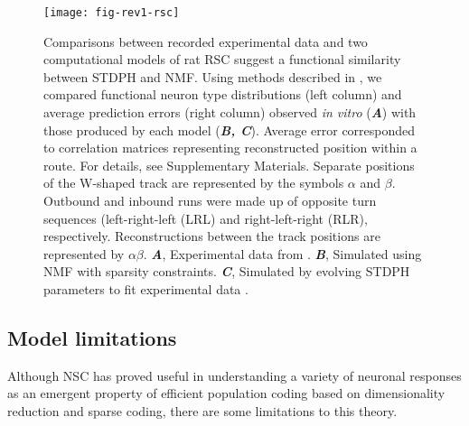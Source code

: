 \begin{figure}[h]
	\centering
	\texttt{[image: fig-rev1-rsc]}
    \caption{
    	Comparisons between recorded experimental data and two 
        computational models of rat \ac{RSC} suggest a functional 
        similarity between \ac{STDPH} and \ac{NMF}.
        Using methods described in \cite{AlexanderNitz2015}, 
        we compared functional neuron type distributions (left column)
        and average  prediction errors (right column)
        observed \emph{in vitro} (\textbf{\emph{A}}) with those
        produced by each model (\textbf{\emph{B, C}}).
        Average error corresponded to correlation matrices 
        representing reconstructed position within a route. 
        For details, see Supplementary Materials.
        Separate positions of the W-shaped track are represented 
        by the symbols $\alpha$ and $\beta$. 
        Outbound and inbound runs were made up of 
        opposite turn sequences (left-right-left (LRL) 
        and right-left-right (RLR), respectively.
        Reconstructions between the track positions are represented by
        $\alpha \beta$.
	    \textbf{\emph{A}},
    		Experimental data from \cite{AlexanderNitz2015}.
        \textbf{\emph{B}},
            Simulated using NMF with sparsity constraints.
        \textbf{\emph{C}},
            Simulated by evolving \ac{STDPH} parameters 
            to fit experimental data \cite{BeyelerCarlsonChou2015,Carlson2014}.
    }
	\label{fig:NMF|RSC}
\end{figure} 


\subsection*{Model limitations}


Although \ac{NSC} has proved useful in understanding
a variety of neuronal responses
as an emergent property of efficient population
coding based on dimensionality reduction and sparse coding,
there are some limitations to this theory.

